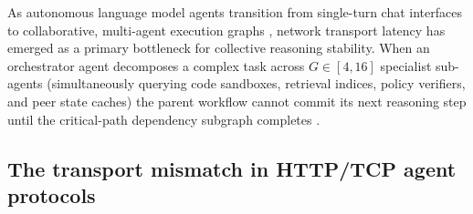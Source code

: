 \documentclass[11pt]{article}
\begin{document}
As autonomous language model agents transition from single-turn chat interfaces to collaborative, multi-agent execution graphs \citep{arxiv2410_11782, arxiv2507_18224, arxiv2603_19677}, network transport latency has emerged as a primary bottleneck for collective reasoning stability. When an orchestrator agent decomposes a complex task across $G \in [4, 16]$ specialist sub-agents (simultaneously querying code sandboxes, retrieval indices, policy verifiers, and peer state caches) the parent workflow cannot commit its next reasoning step until the critical-path dependency subgraph completes \citep{arxiv2503_13657, elina2026maat}.

\subsection{The transport mismatch in HTTP/TCP agent protocols}
\end{document}
